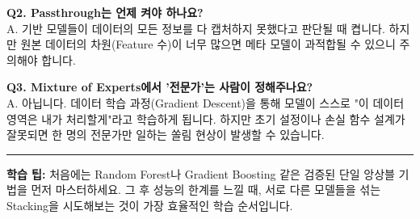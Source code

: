 \documentclass[11pt,a4paper]{book}
\theoremstyle{definition}
\begin{document}
\textbf{Q2. Passthrough는 언제 켜야 하나요?} \\
A. 기반 모델들이 데이터의 모든 정보를 다 캡처하지 못했다고 판단될 때 켭니다. 하지만 원본 데이터의 차원(Feature 수)이 너무 많으면 메타 모델이 과적합될 수 있으니 주의해야 합니다.

\textbf{Q3. Mixture of Experts에서 '전문가'는 사람이 정해주나요?} \\
A. 아닙니다. 데이터 학습 과정(Gradient Descent)을 통해 모델이 스스로 "이 데이터 영역은 내가 처리할게"라고 학습하게 됩니다. 하지만 초기 설정이나 손실 함수 설계가 잘못되면 한 명의 전문가만 일하는 쏠림 현상이 발생할 수 있습니다.

\vspace{1cm}
\hrule
\vspace{0.3cm}
\begin{center}
    \small \textbf{학습 팁:} 처음에는 Random Forest나 Gradient Boosting 같은 검증된 단일 앙상블 기법을 먼저 마스터하세요. 그 후 성능의 한계를 느낄 때, 서로 다른 모델들을 섞는 Stacking을 시도해보는 것이 가장 효율적인 학습 순서입니다.
\end{center}
\end{document}
